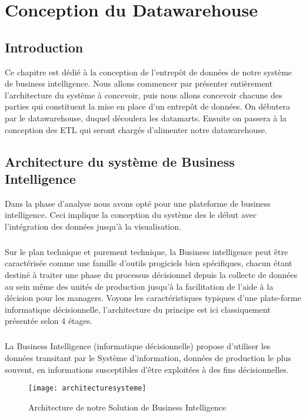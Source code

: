 \chapter{Conception du Datawarehouse}

\section*{Introduction}%
%
Ce chapitre est dédié à la conception de l’entrepôt de données de notre système de business intelligence. Nous allons commencer par présenter entièrement l’architecture du système à concevoir, puis nous allons concevoir chacune des parties qui constituent la mise en place d’un entrepôt de données. On débutera par le datawarehouse, duquel découlera les datamarts. Ensuite on passera à la conception des ETL qui seront chargés d’alimenter notre datawarehouse.

\section{Architecture du système de Business Intelligence}
Dans la phase d’analyse nous avons opté pour une plateforme de business intelligence. Ceci implique la conception du système des le début avec l’intégration des données jusqu’à la visualisation. 
\paragraph{}
Sur le plan technique et purement technique, la Business intelligence peut être caractérisée comme une famille d'outils progiciels bien spécifiques, chacun étant destiné à traiter une phase du processus décisionnel depuis la collecte de données au sein même des unités de production jusqu'à la facilitation de l'aide à la décision pour les managers. Voyons les caractéristiques typiques d'une plate-forme informatique décisionnelle, l'architecture du principe est ici classiquement présentée selon 4 étages.
\paragraph{}
La Business Intelligence (informatique décisionnelle) propose d'utiliser les données transitant par le Système d'information, données de production le plus souvent, en informations susceptibles d'être exploitées à des fins décisionnelles.

\begin{figure}[H]
    \centering
    \texttt{[image: architecturesysteme]}
    \caption{Architecture de notre Solution de Business Intelligence}
    \label{fig:architecturesysteme}
\end{figure}

